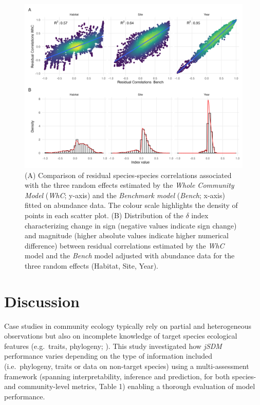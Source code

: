 \begin{refsection}
\begin{figure}
\hypertarget{fig:chapt1fig6}{%
\centering
\includegraphics{03-Chapitre1/figures/fig6.png}
\caption[Comparison of residual species-species correlations
associated with the three random effects estimated by the \emph{Whole
Community Model}. (B) Distribution of the \(\delta\) index characterizing change in sign 
and magnitude between residual correlations estimated by
the \emph{WhC} model and the \emph{Bench} model]{(A) Comparison of residual species-species correlations
associated with the three random effects estimated by the \emph{Whole
Community Model} (\emph{WhC}; y-axis) and the \emph{Benchmark model}
(\emph{Bench}; x-axis) fitted on abundance data. The colour scale
highlights the density of points in each scatter plot. (B) Distribution
of the \(\delta\) index characterizing change in sign (negative values
indicate sign change) and magnitude (higher absolute values indicate
higher numerical difference) between residual correlations estimated by
the \emph{WhC} model and the \emph{Bench} model adjusted with abundance
data for the three random effects (Habitat, Site,
Year).}\label{fig:chapt1fig6}
}
\end{figure}

\clearpage

\hypertarget{discussion}{%
\section{Discussion}\label{discussion}}

Case studies in community ecology typically rely on partial and
heterogeneous observations \autocite{Pollock_2020} but also on
incomplete knowledge of target species ecological features (e.g.~traits,
phylogeny; \textcite{Tyler_2012}). This study investigated how
\emph{jSDM} performance varies depending on the type of information
included (i.e.~phylogeny, traits or data on non-target species) using a
multi-assessment framework (spanning interpretability, inference and
prediction, for both species- and community-level metrics, Table 1)
enabling a thorough evaluation of model performance.


\end{refsection}
